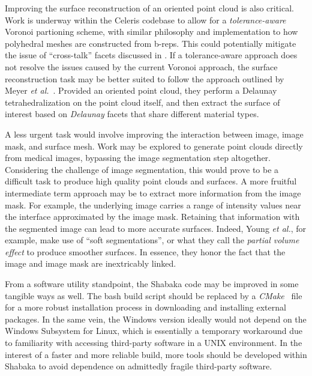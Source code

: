 Improving the surface reconstruction of an oriented point cloud is also critical. Work is underway within the Celeris codebase to allow for a \textit{tolerance-aware} Voronoi partioning scheme, with similar philosophy and implementation to how polyhedral meshes are constructed from b-reps. This could potentially mitigate the issue of ``cross-talk'' facets discussed in . If a tolerance-aware approach does not resolve the issues caused by the current Voronoi approach, the surface reconstruction task may be better suited to follow the approach outlined by Meyer \textit{et al.}~\cite{meyer_2008}. Provided an oriented point cloud, they perform a Delaunay tetrahedralization on the point cloud itself, and then extract the surface of interest based on \textit{Delaunay} facets that share different material types.

A less urgent task would involve improving the interaction between image, image mask, and surface mesh. Work may be explored to generate point clouds directly from medical images, bypassing the image segmentation step altogether. Considering the challenge of image segmentation, this would prove to be a difficult task to produce high quality point clouds and surfaces. A more fruitful intermediate term approach may be to extract more information from the image mask. For example, the underlying image carries a range of intensity values near the interface approximated by the image mask. Retaining that information with the segmented image can lead to more accurate surfaces. Indeed, Young \textit{et al.}, for example, make use of ``soft segmentations'', or what they call the \textit{partial volume effect} to produce smoother surfaces. In essence, they honor the fact that the image and image mask are inextricably linked.

From a software utility standpoint, the Shabaka code may be improved in some tangible ways as well. The bash build script should be replaced by a \textit{CMake}~\cite{cmake} file for a more robust installation process in downloading and installing external packages. In the same vein, the Windows version ideally would not depend on the Windows Subsystem for Linux, which is essentially a temporary workaround due to familiarity with accessing third-party software in a UNIX environment. In the interest of a faster and more reliable build, more tools should be developed within Shabaka to avoid dependence on admittedly fragile third-party software.


